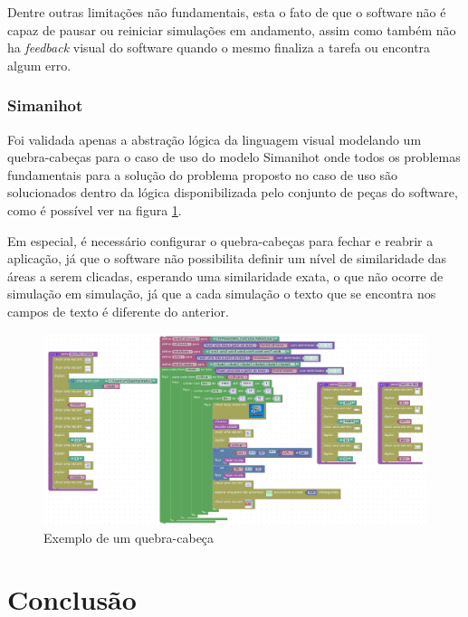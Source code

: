 \documentclass[tg]{mdtufsm}
\begin{document}
            Dentre outras limitações não fundamentais, esta o fato de que o software não é capaz de pausar ou reiniciar simulações em andamento, assim como também não ha \emph{feedback} visual do software quando o mesmo finaliza a tarefa ou encontra algum erro.

            \subsection {Simanihot}

            Foi validada apenas a abstração lógica da linguagem visual modelando um quebra-cabeças para o caso de uso do modelo Simanihot onde todos os problemas fundamentais para a solução do problema proposto no caso de uso são solucionados dentro da lógica disponibilizada pelo conjunto de peças do software, como é possível ver na figura \ref{fig:simanibloco}.

            Em especial, é necessário configurar o quebra-cabeças para fechar e reabrir a aplicação, já que o software não possibilita definir um nível de similaridade das áreas a serem clicadas, esperando uma similaridade exata, o que não ocorre de simulação em simulação, já que a cada simulação o texto que se encontra nos campos de texto é diferente do anterior.

            \begin{figure}[!htb]
                {\centering
                \includegraphics[width=1.0\textwidth]{imagens/simanihotBlock.png}
                \caption{Exemplo de um quebra-cabeça}
                \label{fig:simanibloco}}
            \end{figure}



        \chapter {Conclusão}
\end{document}
